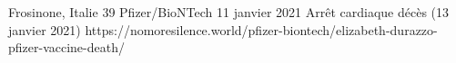           {Frosinone, Italie}
          {39}
          {Pfizer/BioNTech}
          {11 janvier 2021}
          {Arrêt cardiaque décès (13 janvier 2021)}
          {https://nomoresilence.world/pfizer-biontech/elizabeth-durazzo-pfizer-vaccine-death/}

